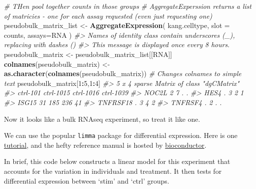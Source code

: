 \documentclass[
]{book}
\newenvironment{Shaded}{\begin{snugshade}}{\end{snugshade}}
\newcommand{\AttributeTok}[1]{\textcolor[rgb]{0.13,0.29,0.53}{#1}}
\newcommand{\CommentTok}[1]{\textcolor[rgb]{0.56,0.35,0.01}{\textit{#1}}}
\newcommand{\DecValTok}[1]{\textcolor[rgb]{0.00,0.00,0.81}{#1}}
\newcommand{\FunctionTok}[1]{\textcolor[rgb]{0.13,0.29,0.53}{\textbf{#1}}}
\newcommand{\NormalTok}[1]{#1}
\newcommand{\OtherTok}[1]{\textcolor[rgb]{0.56,0.35,0.01}{#1}}
\newcommand{\SpecialCharTok}[1]{\textcolor[rgb]{0.81,0.36,0.00}{\textbf{#1}}}
\newcommand{\StringTok}[1]{\textcolor[rgb]{0.31,0.60,0.02}{#1}}
\begin{document}
\begin{Shaded}
\begin{Highlighting}[]
\CommentTok{\# THen pool together counts in those groups}
\CommentTok{\# AggregateExperssion returns a list of matricies {-} one for each assay requested (even just requesting one)}
\NormalTok{pseudobulk\_matrix\_list }\OtherTok{\textless{}{-}} \FunctionTok{AggregateExpression}\NormalTok{( kang.celltype,  }\AttributeTok{slot =} \StringTok{\textquotesingle{}counts\textquotesingle{}}\NormalTok{, }\AttributeTok{assays=}\StringTok{\textquotesingle{}RNA\textquotesingle{}}\NormalTok{ )}
\CommentTok{\#\textgreater{} Names of identity class contain underscores (\textquotesingle{}\_\textquotesingle{}), replacing with dashes (\textquotesingle{}{-}\textquotesingle{})}
\CommentTok{\#\textgreater{} This message is displayed once every 8 hours.}
\NormalTok{pseudobulk\_matrix      }\OtherTok{\textless{}{-}}\NormalTok{ pseudobulk\_matrix\_list[[}\StringTok{\textquotesingle{}RNA\textquotesingle{}}\NormalTok{]]}
\FunctionTok{colnames}\NormalTok{(pseudobulk\_matrix) }\OtherTok{\textless{}{-}} \FunctionTok{as.character}\NormalTok{(}\FunctionTok{colnames}\NormalTok{(pseudobulk\_matrix)) }\CommentTok{\# Changes colnames to simple text}
\NormalTok{pseudobulk\_matrix[}\DecValTok{1}\SpecialCharTok{:}\DecValTok{5}\NormalTok{,}\DecValTok{1}\SpecialCharTok{:}\DecValTok{4}\NormalTok{]}
\CommentTok{\#\textgreater{} 5 x 4 sparse Matrix of class "dgCMatrix"}
\CommentTok{\#\textgreater{}          ctrl{-}101 ctrl{-}1015 ctrl{-}1016 ctrl{-}1039}
\CommentTok{\#\textgreater{} NOC2L           2         7         .         .}
\CommentTok{\#\textgreater{} HES4            .         3         2         1}
\CommentTok{\#\textgreater{} ISG15          31       185       236        41}
\CommentTok{\#\textgreater{} TNFRSF18        .         3         4         2}
\CommentTok{\#\textgreater{} TNFRSF4         .         2         .         .}
\end{Highlighting}
\end{Shaded}

Now it looks like a bulk RNAseq experiment, so treat it like one.

We can use the popular \texttt{limma} package for differential expression. Here is one \href{https://ucdavis-bioinformatics-training.github.io/2018-June-RNA-Seq-Workshop/thursday/DE.html}{tutorial}, and the hefty reference manual is hosted by \href{https://bioconductor.org/packages/release/bioc/html/limma.html}{bioconductor}.

In brief, this code below constructs a linear model for this experiment that accounts for the variation in individuals and treatment. It then tests for differential expression between `stim' and `ctrl' groups.
\end{document}
